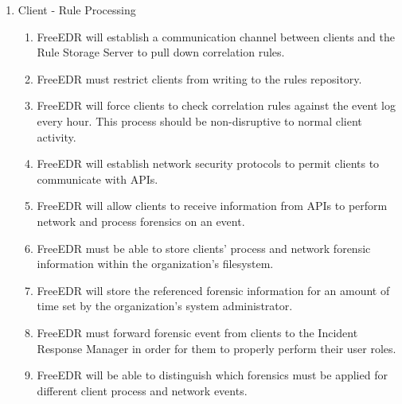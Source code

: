 \documentclass{scrreprt}
\begin{document}
\begin{enumerate}[resume*]
    \item Client - Rule Processing
    \begin{enumerate}[label*=\arabic*.]
         \item FreeEDR will establish a communication channel between clients and the Rule Storage Server to pull down correlation rules.
	\item FreeEDR must restrict clients from writing to the rules repository.
\item FreeEDR will force clients to check correlation rules against the event log every hour. This process should be non-disruptive to normal client activity.
\item FreeEDR will establish network security protocols to permit clients to communicate with APIs.
\item FreeEDR will allow clients to receive information from APIs to perform network and process forensics on an event.
\item FreeEDR must be able to store clients’ process and network forensic information within the organization’s filesystem.
\item FreeEDR will store the referenced forensic information for an amount of time set by the organization’s system administrator.
\item FreeEDR must forward forensic event from clients to the Incident Response Manager in order for them to properly perform their user roles.
\item FreeEDR will be able to distinguish which forensics must be applied for different client process and network events.

    \end{enumerate}
\end{enumerate}
\end{document}
